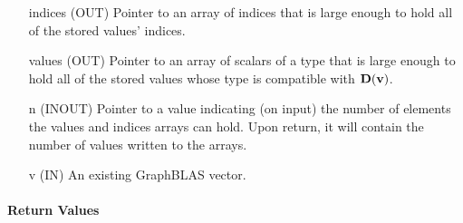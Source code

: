 \begin{itemize}[leftmargin=1.1in]
    \item[{\sf indices}] ({\sf OUT}) Pointer to an array of indices that is
                        large enough to hold all of the stored values' indices.
    \item[{\sf values}] ({\sf OUT}) Pointer to an array of scalars of a type 
                        that is large enough to hold all of the stored values
                        whose type is compatible with $\mathbf{D}({\bf v})$.
    \item[{\sf n}] ({\sf INOUT}) Pointer to a value indicating (on input) the number of
                        elements the {\sf values} and
                        {\sf indices} arrays can hold. Upon return, it will contain the
                        number of values written to the arrays.
    \item[{\sf v}]      ({\sf IN})  An existing GraphBLAS vector.
\end{itemize}

\paragraph{Return Values}

